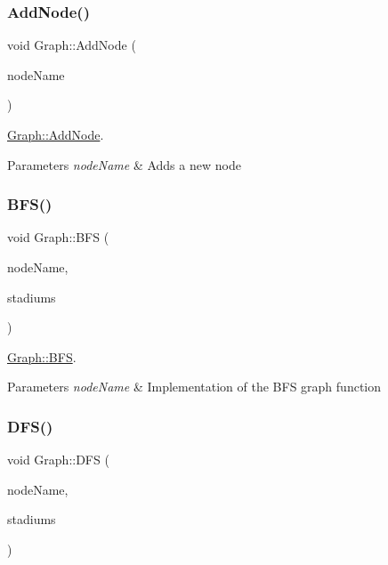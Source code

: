 \subsubsection{\texorpdfstring{Add\+Node()}{AddNode()}}
{\footnotesize\ttfamily void Graph\+::\+Add\+Node (\begin{DoxyParamCaption}\item[{Q\+String}]{node\+Name }\end{DoxyParamCaption})}



\mbox{\hyperlink{class_graph_a6fc3cb2886337e235a6f7a417e3d6c62}{Graph\+::\+Add\+Node}}. 


\begin{DoxyParams}{Parameters}
{\em node\+Name} & Adds a new node \\
\hline
\end{DoxyParams}
\mbox{\label{class_graph_a0e0f425a2a7a20151f1fcf537c32d7b5}} 
\subsubsection{\texorpdfstring{B\+F\+S()}{BFS()}}
{\footnotesize\ttfamily void Graph\+::\+B\+FS (\begin{DoxyParamCaption}\item[{Q\+String}]{node\+Name,  }\item[{Q\+Vector$<$ Q\+String $>$ \&}]{stadiums }\end{DoxyParamCaption})}



\mbox{\hyperlink{class_graph_a0e0f425a2a7a20151f1fcf537c32d7b5}{Graph\+::\+B\+FS}}. 


\begin{DoxyParams}{Parameters}
{\em node\+Name} & Implementation of the B\+FS graph function \\
\hline
\end{DoxyParams}
\mbox{\label{class_graph_aa13f9b10f1dd61da066dd59901598e56}} 
\subsubsection{\texorpdfstring{D\+F\+S()}{DFS()}}
{\footnotesize\ttfamily void Graph\+::\+D\+FS (\begin{DoxyParamCaption}\item[{Q\+String}]{node\+Name,  }\item[{Q\+Vector$<$ Q\+String $>$ \&}]{stadiums }\end{DoxyParamCaption})}



